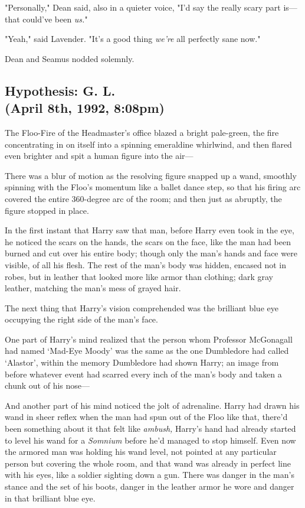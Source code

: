 "Personally," Dean said, also in a quieter voice, "I'd say the really scary 
part is---that could've been \emph{us.}"

"Yeah," said Lavender. "It's a good thing \emph{we're} all perfectly sane now."

Dean and Seamus nodded solemnly.
\sbreak
\vspace{-2\baselineskip}
\subsection{Hypothesis: G. L.\\
(April 8th, 1992, 8:08pm)}

The Floo-Fire of the Headmaster's office blazed a bright pale-green, the fire 
concentrating in on itself into a spinning emeraldine whirlwind, and then 
flared even brighter and spit a human figure into the air---

There was a blur of motion as the resolving figure snapped up a wand, smoothly 
spinning with the Floo's momentum like a ballet dance step, so that his firing 
arc covered the entire 360-degree arc of the room; and then just as abruptly, 
the figure stopped in place.

In the first instant that Harry saw that man, before Harry even took in the 
eye, he noticed the scars on the hands, the scars on the face, like the man had 
been burned and cut over his entire body; though only the man's hands and face 
were visible, of all his flesh. The rest of the man's body was hidden, encased 
not in robes, but in leather that looked more like armor than clothing; dark 
gray leather, matching the man's mess of grayed hair.

The next thing that Harry's vision comprehended was the brilliant blue eye 
occupying the right side of the man's face.

One part of Harry's mind realized that the person whom Professor McGonagall had 
named `Mad-Eye Moody' was the same as the one Dumbledore had called `Alastor', 
within the memory Dumbledore had shown Harry; an image from before whatever 
event had scarred every inch of the man's body and taken a chunk out of his 
nose---

And another part of his mind noticed the jolt of adrenaline. Harry had drawn 
his wand in sheer reflex when the man had spun out of the Floo like that, 
there'd been something about it that felt like \emph{ambush,} Harry's hand had 
already started to level his wand for a \emph{Somnium} before he'd managed to 
stop himself. Even now the armored man was holding his wand level, not pointed 
at any particular person but covering the whole room, and that wand was already 
in perfect line with his eyes, like a soldier sighting down a gun. There was 
danger in the man's stance and the set of his boots, danger in the leather 
armor he wore and danger in that brilliant blue eye.

